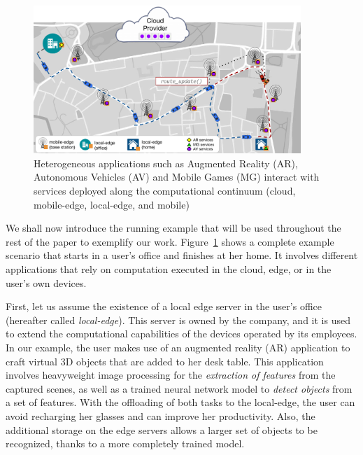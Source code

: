 \begin{figure}[tbp]
	\includegraphics[width=0.9\textwidth]{figs/Continuum-Scenario}
	\caption{Heterogeneous applications such as Augmented Reality (AR), Autonomous Vehicles (AV) and Mobile Games (MG) interact with services deployed along the computational continuum (cloud, mobile-edge, local-edge, and mobile)}
	\label{fig:continuum-scenario}
\end{figure}

We shall now introduce the running example that will be used throughout the rest of the paper to exemplify our work. Figure~\ref{fig:continuum-scenario} shows a complete example scenario that starts in a user's office and finishes at her home. It involves different applications that rely on computation executed in the cloud, edge, or in the user's own devices. 

First, let us assume the existence of a local edge server in the user's office (hereafter called \textit{local-edge}). This server is owned by the company, and it is used to extend the computational capabilities of the devices operated by its employees. In our example, the user makes use of an augmented reality (AR) application to craft virtual 3D objects that are added to her desk table. This application involves heavyweight image processing for the \textit{extraction of features} from the captured scenes, as well as a trained neural network model to \textit{detect objects} from a set of features. With the offloading of both tasks to the local-edge, the user can avoid recharging her glasses and can improve her productivity. Also, the additional storage on the edge servers allows a larger set of objects to be recognized, thanks to a more completely trained model.

